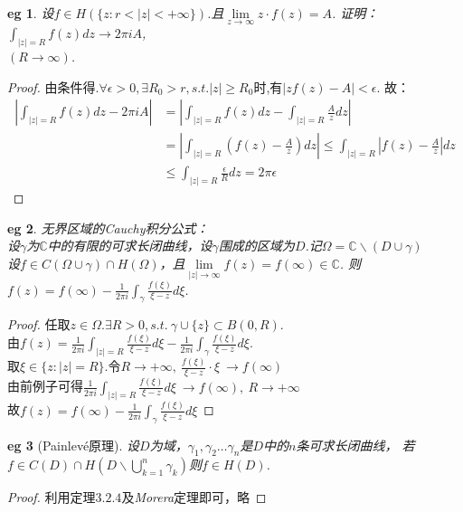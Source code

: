\documentclass[b5paper,decoration]{qyxf-book}%
\newtheorem*{eg}{eg}%
\begin{document}
\begin{eg}
    设$f\in H(\{z:r<|z|<+\infty\})$.且$\lim\limits_{z\rightarrow\infty}z\cdot f(z)=A$.
    证明：$\displaystyle{\int_{|z|=R}f(z)dz\rightarrow 2\pi iA}$,\\$(R\rightarrow\infty)$.
\end{eg}
\begin{proof}
    由条件得.$\forall\epsilon>0,\exists R_0>r,s.t.|z|\geq R_0$时,有$|zf(z)-A|<\epsilon$.
    故：
    \begin{align*}
        \left|\int_{|z|=R}f(z)dz-2\pi iA\right|
        &=\left|\int_{|z|=R}f(z)dz-\int_{|z|=R}\frac{A}{z}dz\right|\\
        &=\left|\int_{|z|=R}(f(z)-\frac{A}{z})dz\right|\leq\int_{|z|=R}\left|f(z)-\frac{A}{z}\right|dz\\
        &\leq\int_{|z|=R}\frac{\epsilon}{R}dz=2\pi\epsilon
    \end{align*}
\end{proof}
\begin{eg}
    无界区域的\emph{Cauchy}积分公式：\\
    设$\gamma$为$\mathbb{C}$中的有限的可求长闭曲线，设$\gamma$围成的区域为$D$.记$\Omega=\mathbb{C}\backslash(D\cup \gamma)$\\
    设$f\in C(\Omega\cup \gamma)\cap H(\Omega)$，且$\lim\limits_{|z|\rightarrow\infty}f(z)=f(\infty)\in\mathbb{C}$.
    则$\displaystyle{f(z)=f(\infty)-\frac{1}{2\pi i}\int_{\gamma}\frac{f(\xi)}{\xi-z}d\xi}$.
\end{eg}
\begin{proof}
    任取$\displaystyle{z\in\Omega.\exists R>0,s.t.\ \gamma\cup\{z\}\subset B(0,R)}$.\\
    由$\displaystyle{f(z)=\frac{1}{2\pi i}\int_{|z|=R}\frac{f(\xi)}{\xi-z}d\xi-\frac{1}{2\pi i}\int_{\gamma}\frac{f(\xi)}{\xi-z}d\xi}$.\\
    取$\displaystyle{\xi\in\{z:|z|=R\}}$.令$\displaystyle{R\rightarrow+\infty,\ \frac{f(\xi)}{\xi-z}\cdot\xi\ \rightarrow f(\infty)}$\\
    由前例子可得$\displaystyle{\frac{1}{2\pi i}\int_{|z|=R}\frac{f(\xi)}{\xi-z}d\xi\ \rightarrow f(\infty),\ R\rightarrow+\infty}$\\
    故$\displaystyle{f(z)=f(\infty)-\frac{1}{2\pi i}\int_\gamma\frac{f(\xi)}{\xi-z}d\xi}$
\end{proof}

\begin{eg}[Painlev\'e原理]
    设$D$为域，$\gamma_1,\gamma_2\dots \gamma_n$是$D$中的$n$条可求长闭曲线，
    若$\displaystyle{f\in C(D)\cap H(D\backslash \mathop{\bigcup}\limits_{k=1}^{n}\gamma_k)}$则$f\in H(D)$.
\end{eg}
\begin{proof}
    利用定理$3.2.4$及\emph{Morera}定理即可，略
\end{proof}
\end{document}
